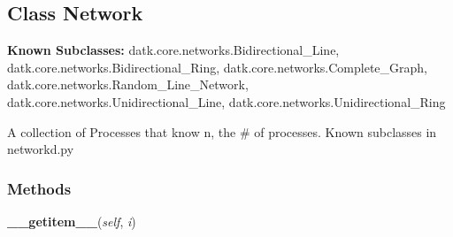 \subsection{Class Network}

    \label{datk:core:distalgs:Network}
\textbf{Known Subclasses:}
datk.core.networks.Bidirectional\_Line,
    datk.core.networks.Bidirectional\_Ring,
    datk.core.networks.Complete\_Graph,
    datk.core.networks.Random\_Line\_Network,
    datk.core.networks.Unidirectional\_Line,
    datk.core.networks.Unidirectional\_Ring

A collection of Processes that know n, the \# of processes. Known 
subclasses in networkd.py



  \subsubsection{Methods}

    \label{datk:core:distalgs:Network:__getitem__}

    \vspace{0.5ex}

\hspace{.8\funcindent}\begin{boxedminipage}{\funcwidth}

    \raggedright \textbf{\_\_getitem\_\_}(\textit{self}, \textit{i})

\setlength{\parskip}{2ex}
\setlength{\parskip}{1ex}
    \end{boxedminipage}

    \label{datk:core:distalgs:Network:__init__}

    \vspace{0.5ex}

